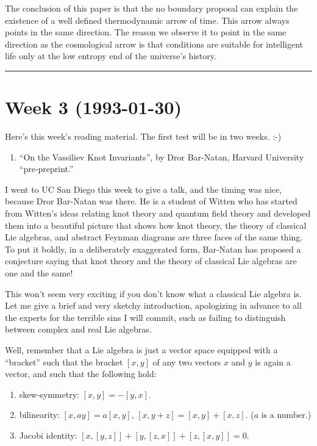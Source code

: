 \documentclass{article}
\def\tightlist{}
\begin{document}
The conclusion of this paper is that the no boundary proposal can
explain the existence of a well defined thermodynamic arrow of time.
This arrow always points in the same direction. The reason we observe it
to point in the same direction as the cosmological arrow is that
conditions are suitable for intelligent life only at the low entropy end
of the universe's history.

\begin{center}\rule{0.5\linewidth}{0.5pt}\end{center}
\hypertarget{week-3-1993-01-30}{%
\section{Week 3 (1993-01-30)}\label{week-3-1993-01-30}}

Here's this week's reading material. The first test will be in two
weeks. :-)

\begin{enumerate}
\def\labelenumi{\arabic{enumi})}
\tightlist
\item
  ``On the Vassiliev Knot Invariants'', by Dror Bar-Natan, Harvard
  University ``pre-preprint.''
\end{enumerate}

I went to UC San Diego this week to give a talk, and the timing was
nice, because Dror Bar-Natan was there. He is a student of Witten who
has started from Witten's ideas relating knot theory and quantum field
theory and developed them into a beautiful picture that shows how knot
theory, the theory of classical Lie algebras, and abstract Feynman
diagrams are three faces of the same thing. To put it boldly, in a
deliberately exaggerated form, Bar-Natan has proposed a conjecture
saying that knot theory and the theory of classical Lie algebras are one
and the same!

This won't seem very exciting if you don't know what a classical Lie
algebra is. Let me give a brief and very sketchy introduction,
apologizing in advance to all the experts for the terrible sins I will
commit, such as failing to distinguish between complex and real Lie
algebras.

Well, remember that a Lie algebra is just a vector space equipped with a
``bracket'' such that the bracket \([x,y]\) of any two vectors \(x\) and
\(y\) is again a vector, and such that the following hold:

\begin{enumerate}
\def\labelenumi{\alph{enumi})}
\tightlist
\item
  skew-symmetry: \([x,y] = -[y,x]\).
\item
  bilinearity: \([x,ay] = a[x,y]\), \([x,y+z] = [x,y] + [x,z]\). (\(a\)
  is a number.)
\item
  Jacobi identity: \([x,[y,z]] + [y,[z,x]] + [z,[x,y]] = 0\).
\end{enumerate}
\end{document}
